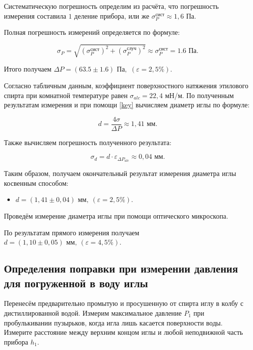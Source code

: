 \documentclass[12pt,a4paper]{article}
\begin{document}
Систематическую погрешность определим из расчёта, что погрешность измерения составила $ 1 $ деление прибора, или же {$ \sigma_{P}^\text{сист} \approx 1,6 $ Па}.

Полная погрешность измерений определяется по формуле:

\begin{equation}\label{full_pogr}
\sigma_{P}=\sqrt{(\sigma_{P}^\text{сист})^2 + (\sigma_{P}^\text{случ})^2} \approx \sigma_{P}^\text{сист} = 1.6 \text{ Па}.
\end{equation}

Итого получаем { $ \Delta P = (63.5 \pm 1.6) \text{ Па},$} \quad $(\varepsilon = 2,5 \%) $.


Согласно табличным данным, коэффициент поверхностного натяжения этилового спирта при комнатной температуре равен $ \sigma_{alc} = 22,4 $ мН/м. По полученным результатам измерения и при помощи \eqref{key} вычисляем диаметр иглы по формуле:

\label{diametr}

\begin{equation}\label{igla}
d=\frac{4\sigma}{\Delta P} \approx 1,41 \text{ мм}.
\end{equation}

Также вычисляем погрешность полученного результата:

\begin{equation}\label{igla_pogr}
\sigma_d=d\cdot\varepsilon_{\Delta P_{alc}} \approx 0,04 \text{ мм}.
\end{equation}

Таким образом, получаем окончательный результат измерения диаметра иглы косвенным способом:
\begin{itemize}
	\item ${ d = (1,41 \pm 0,04) \text{ мм},} \: (\varepsilon = 2,5\%). $
\end{itemize}

Проведём измерение диаметра иглы при помощи оптического микроскопа.

По результатам прямого измерения получаем $ {d = (1,10 \pm 0,05) \text{ мм}}, \: (\varepsilon = 4,5\%) $.



\subsection{Определения поправки при измерении давления для погруженной в воду иглы}

Перенесём предварительно промытую и просушенную от спирта иглу в колбу с дистиллированной водой. Измерим максимальное давление $ P_1 $ при пробулькивании пузырьков, когда игла лишь касается поверхности воды. Измерите расстояние между верхним концом иглы и любой неподвижной часть прибора $ h_1 $.
\end{document}
